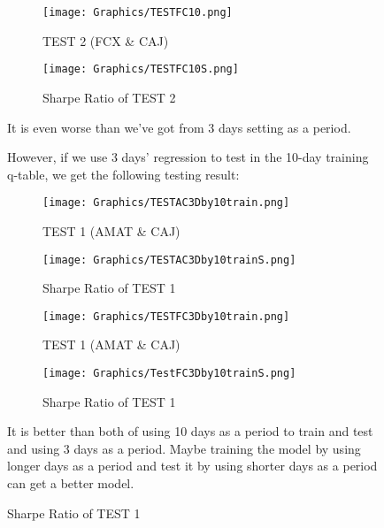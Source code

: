 \newpage
\begin{figure}[H]
\begin{subfigure}{.5\textwidth}%
\centering
\texttt{[image: Graphics/TESTFC10.png]} \caption{TEST 2 (FCX \& CAJ)} 
\end{subfigure}%
\begin{subfigure}{.5\textwidth}%
\centering
\texttt{[image: Graphics/TESTFC10S.png]} \caption{Sharpe Ratio of TEST 2}
\end{subfigure}%
\vspace{0.4cm}

It is even worse than we've got from 3 days setting as a period.

\vspace{0.4cm}

However, if we use 3 days’ regression to test in the 10-day training q-table, we get the following testing result:

\vspace{0.4cm}

\begin{subfigure}{.5\textwidth}%
\centering
\texttt{[image: Graphics/TESTAC3Dby10train.png]} \caption{TEST 1 (AMAT \& CAJ)} 
\end{subfigure}%
\begin{subfigure}{.5\textwidth}%
\centering
\texttt{[image: Graphics/TESTAC3Dby10trainS.png]} \caption{Sharpe Ratio of TEST 1}
\end{subfigure}%
\vspace{0.4cm}
\begin{subfigure}{.5\textwidth}%
\centering
\texttt{[image: Graphics/TESTFC3Dby10train.png]} \caption{TEST 1 (AMAT \& CAJ)} 
\end{subfigure}%
\begin{subfigure}{.5\textwidth}%
\centering
\texttt{[image: Graphics/TestFC3Dby10trainS.png]} \caption{Sharpe Ratio of TEST 1}
\end{subfigure}%

\vspace{0.4cm}

It is better than both of using 10 days as a period to train and test and using 3 days as a period. Maybe training the model by using longer days as a period and test it by using shorter days as a period can get a better model.

\end{figure}


